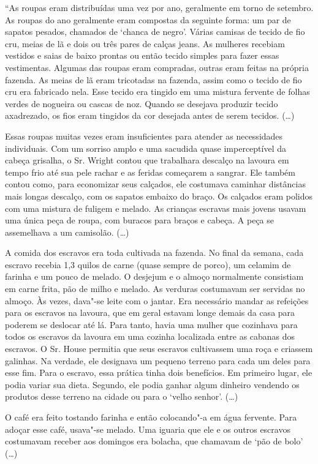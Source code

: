 ``As roupas eram distribuídas uma vez por ano, geralmente em torno de
setembro. As roupas do ano geralmente eram compostas da seguinte forma:
um par de sapatos pesados, chamados de `chanca de negro'. Várias camisas
de tecido de fio cru, meias de lã e dois ou três pares de calças jeans.
As mulheres recebiam vestidos e saias de baixo prontas ou então tecido
simples para fazer essas vestimentas. Algumas das roupas eram compradas,
outras eram feitas na própria fazenda. As meias de lã eram tricotadas na
fazenda, assim como o tecido de fio cru era fabricado nela. Esse tecido
era tingido em uma mistura fervente de folhas verdes de nogueira ou
cascas de noz. Quando se desejava produzir tecido axadrezado, os fios
eram tingidos da cor desejada antes de serem tecidos. (\ldots{})

Essas roupas muitas vezes eram insuficientes para atender as
necessidades individuais. Com um sorriso amplo e uma sacudida quase
imperceptível da cabeça grisalha, o Sr. Wright contou que trabalhara
descalço na lavoura em tempo frio até sua pele rachar e as feridas
começarem a sangrar. Ele também contou como, para economizar seus
calçados, ele costumava caminhar distâncias mais longas descalço, com os
sapatos embaixo do braço. Os calçados eram polidos com uma mistura de
fuligem e melado. As crianças escravas mais jovens usavam uma única peça
de roupa, com buracos para braços e cabeça. A peça se assemelhava a um
camisolão. (\ldots{})

A comida dos escravos era toda cultivada na fazenda. No final da semana,
cada escravo recebia 1,3 quilos de carne (quase sempre de porco), um celamim
de farinha e um pouco de melado. O desjejum e o almoço normalmente
consistiam em carne frita, pão de milho e melado. As verduras costumavam
ser servidas no almoço. Às vezes, dava"-se leite com o jantar. Era
necessário mandar as refeições para os escravos na lavoura, que em geral
estavam longe demais da casa para poderem se deslocar até lá. Para
tanto, havia uma mulher que cozinhava para todos os escravos da lavoura
em uma cozinha localizada entre as cabanas dos escravos. O Sr. House
permitia que seus escravos cultivassem uma roça e criassem galinhas. Na
verdade, ele designava um pequeno terreno para cada um deles para esse
fim. Para o escravo, essa prática tinha dois benefícios. Em primeiro
lugar, ele podia variar sua dieta. Segundo, ele podia ganhar algum
dinheiro vendendo os produtos desse terreno na cidade ou para o `velho
senhor'. (\ldots{})

O café era feito tostando farinha e então colocando"-a em água fervente.
Para adoçar esse café, usava"-se melado. Uma iguaria que ele e os outros
escravos costumavam receber aos domingos era bolacha, que chamavam de
`pão de bolo' (\ldots{})

